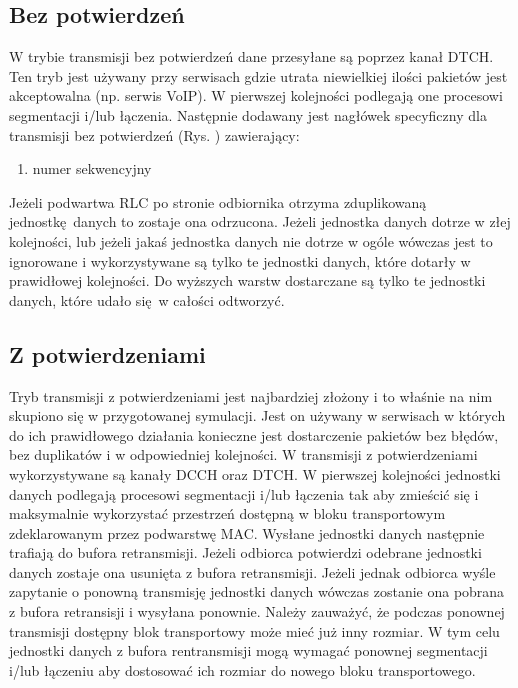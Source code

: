 \subsection{Bez potwierdzeń}
\label{subsec:um}

W trybie transmisji bez potwierdzeń dane przesyłane są poprzez kanał DTCH. Ten tryb jest używany przy serwisach gdzie utrata niewielkiej ilości pakietów jest akceptowalna (np. serwis VoIP). W pierwszej kolejności podlegają one procesowi segmentacji i/lub łączenia. Następnie dodawany jest nagłówek specyficzny dla transmisji bez potwierdzeń (Rys. ) zawierający: 
\begin{enumerate}
	\item numer sekwencyjny
\end{enumerate}
 Jeżeli podwartwa RLC po stronie odbiornika otrzyma zduplikowaną jednostkę danych to zostaje ona odrzucona. Jeżeli jednostka danych dotrze w złej kolejności, lub jeżeli jakaś jednostka danych nie dotrze w ogóle wówczas jest to ignorowane i wykorzystywane są tylko te jednostki danych, które dotarły w prawidłowej kolejności. Do wyższych warstw dostarczane są tylko te jednostki danych, które udało się w całości odtworzyć. 

\subsection{Z potwierdzeniami}
\label{subsec:am}

Tryb transmisji z potwierdzeniami jest najbardziej złożony i to właśnie na nim skupiono się w przygotowanej symulacji. Jest on używany w serwisach w których do ich prawidłowego działania konieczne jest dostarczenie pakietów bez błędów, bez duplikatów i w odpowiedniej kolejności. W transmisji z potwierdzeniami wykorzystywane są kanały DCCH oraz DTCH. W pierwszej kolejności jednostki danych podlegają procesowi segmentacji i/lub łączenia tak aby zmieścić się i maksymalnie wykorzystać przestrzeń dostępną w bloku transportowym zdeklarowanym przez podwarstwę MAC. Wysłane jednostki danych następnie trafiają do bufora retransmisji. Jeżeli odbiorca potwierdzi odebrane jednostki danych zostaje ona usunięta z bufora retransmisji. Jeżeli jednak odbiorca wyśle zapytanie o ponowną transmisję jednostki danych wówczas zostanie ona pobrana z bufora retransisji i wysyłana ponownie. Należy zauważyć, że podczas ponownej transmisji dostępny blok transportowy może mieć już inny rozmiar. W tym celu jednostki danych z bufora rentransmisji mogą wymagać ponownej segmentacji i/lub łączeniu aby dostosować ich rozmiar do nowego bloku transportowego.

